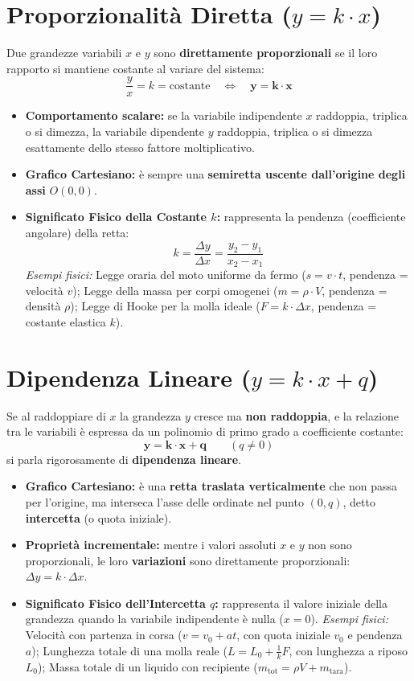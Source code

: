 \documentclass[11pt,a4paper,oneside]{report}
\begin{document}
\section{Proporzionalità Diretta ($y = k \cdot x$)}
Due grandezze variabili $x$ e $y$ sono \textbf{direttamente proporzionali} se il loro rapporto si mantiene costante al variare del sistema:
\[
\frac{y}{x} = k = \text{costante} \quad \Longleftrightarrow \quad \mathbf{y = k \cdot x}
\]
\begin{itemize}
  \item \textbf{Comportamento scalare:} se la variabile indipendente $x$ raddoppia, triplica o si dimezza, la variabile dipendente $y$ raddoppia, triplica o si dimezza esattamente dello stesso fattore moltiplicativo.
  \item \textbf{Grafico Cartesiano:} è sempre una \textbf{semiretta uscente dall'origine degli assi} $O(0, 0)$.
  \item \textbf{Significato Fisico della Costante $k$:} rappresenta la pendenza (coefficiente angolare) della retta:
  \[
  k = \frac{\Delta y}{\Delta x} = \frac{y_2 - y_1}{x_2 - x_1}
  \]
  \textit{Esempi fisici:} Legge oraria del moto uniforme da fermo ($s = v \cdot t$, pendenza = velocità $v$); Legge della massa per corpi omogenei ($m = \rho \cdot V$, pendenza = densità $\rho$); Legge di Hooke per la molla ideale ($F = k \cdot \Delta x$, pendenza = costante elastica $k$).
\end{itemize}

\section{Dipendenza Lineare ($y = k \cdot x + q$)}
Se al raddoppiare di $x$ la grandezza $y$ cresce ma \textbf{non raddoppia}, e la relazione tra le variabili è espressa da un polinomio di primo grado a coefficiente costante:
\[
\mathbf{y = k \cdot x + q} \qquad (q \neq 0)
\]
si parla rigorosamente di \textbf{dipendenza lineare}.
\begin{itemize}
  \item \textbf{Grafico Cartesiano:} è una \textbf{retta traslata verticalmente} che non passa per l'origine, ma interseca l'asse delle ordinate nel punto $(0, q)$, detto \textbf{intercetta} (o quota iniziale).
  \item \textbf{Proprietà incrementale:} mentre i valori assoluti $x$ e $y$ non sono proporzionali, le loro \textbf{variazioni} sono direttamente proporzionali: $\Delta y = k \cdot \Delta x$.
  \item \textbf{Significato Fisico dell'Intercetta $q$:} rappresenta il valore iniziale della grandezza quando la variabile indipendente è nulla ($x = 0$).
  \textit{Esempi fisici:} Velocità con partenza in corsa ($v = v_0 + a t$, con quota iniziale $v_0$ e pendenza $a$); Lunghezza totale di una molla reale ($L = L_0 + \frac{1}{k}F$, con lunghezza a riposo $L_0$); Massa totale di un liquido con recipiente ($m_{\text{tot}} = \rho V + m_{\text{tara}}$).
\end{itemize}
\end{document}
